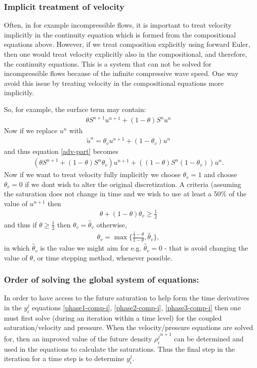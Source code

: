 \subsubsection{Implicit treatment of velocity} 
Often, in for example incompressible flows, it is important to treat velocity 
implicitly in the continuity equation which is formed from the compositional 
equations above. However, if we treat composition explicitly using forward Euler, then 
one would treat velocity explicitly also in the compositional, and therefore, the 
continuity equations. This is a system that can not be solved for incompressible 
flows because of the infinite compressive wave speed. One way avoid this issue 
by treating velocity in the compositional equations more implicitly. 

So, for example, the surface term may contain:
\begin{eqnarray}
\theta S^{n+1} u^{n+1} + (1-\theta) S^n u^n \label{adv-part} 
\end{eqnarray}
Now if we replace $u^n$ with 
\begin{eqnarray}
\tilde u^n = \theta_v u^{n+1} + (1-\theta_v) u^n 
\end{eqnarray}
and thus equation \ref{adv-part} becomes
\begin{eqnarray}
(\theta S^{n+1} +(1-\theta) S^{n}\theta_v ) u^{n+1} + ((1-\theta) S^n (1-\theta_v)) u^n . 
\label{adv-part-implicit-vel}
\end{eqnarray}
Now if we want to treat velocity fully implicitly we choose $\theta_v=1$ and choose 
$\theta_v=0$ if we dont wish to alter the original discretization. 
A criteria (assuming the saturation does not change in time and we wish to use 
at least a 50$\%$ of the value of $u^{n+1}$ then 
\begin{eqnarray}
\theta+(1-\theta)\theta_v\ge \frac{1}{2} 
\end{eqnarray}
and thus if $\theta\ge\frac{1}{2}$ then $\theta_v = \hat\theta_v$ otherwise,  
\begin{eqnarray}
\theta_v =\max\{ \frac{\frac{1}{2}-\theta}{1-\theta}, \hat\theta_v \} , 
\end{eqnarray}
in which $\hat\theta_v$ is the value we might aim for e.g.  $\hat\theta_v=0$ - that is avoid changing the 
value of $\theta$, or time stepping method, whenever possible. 



\subsubsection{Order of solving the global system of equations:} In order to have access to 
the future saturation to help form the time derivatives in the $y_i^j$ 
equations 
\ref{phase1-comp-i}, \ref{phase2-comp-i}, \ref{phase3-comp-i} then one must first solve 
(during an iteration within a time level) for the coupled saturation/velocity and 
pressure. When the velocity/pressure equations are solved for, then an improved 
value of the future density ${\rho^j_i}^{n+1}$ can be determined and used in 
the equations to calculate the saturations. Thus the final step in the iteration 
for a time step is to determine $y_i^j$. 



